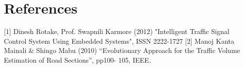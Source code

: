 \documentclass{report}
\begin{document}

\section*{References} %


[1] Dinesh Rotake, Prof. Swapnili Karmore (2012) "Intelligent Traffic Signal Control System Using Embedded Systems", ISSN 2222-1727
[2] Manoj Kanta Mainali & Shingo Mabu (2010) “Evolutionary Approach for the Traffic Volume
Estimation of Road Sections”, pp100- 105, IEEE.
\end{document}

